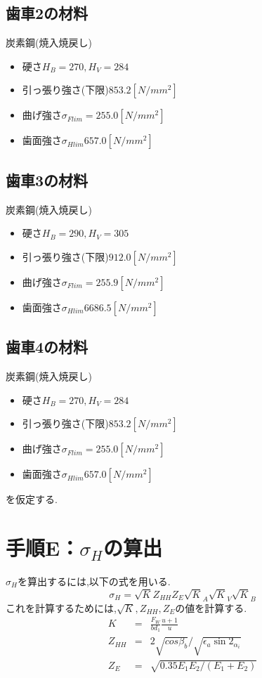 \documentclass[a4j,twoside,openright,11pt]{jreport}
\begin{document}
\subsection{歯車2の材料}
炭素鋼(焼入焼戻し)
\begin{itemize}
\item 硬さ$ H_B = 270,H_V=284$
\item 引っ張り強さ(下限)$853.2[N/mm^2]$
\item 曲げ強さ$\sigma_{Flim}=255.0[N/mm^2]$
\item 歯面強さ$\sigma_{Hlim}657.0[N/mm^2]$
\end{itemize}
\subsection{歯車3の材料}
炭素鋼(焼入焼戻し)
\begin{itemize}
\item 硬さ$ H_B = 290,H_V=305$
\item 引っ張り強さ(下限)$912.0[N/mm^2]$
\item 曲げ強さ$\sigma_{Flim}=255.9[N/mm^2]$
\item 歯面強さ$\sigma_{Hlim}6686.5[N/mm^2]$
\end{itemize}
\subsection{歯車4の材料}
炭素鋼(焼入焼戻し)
\begin{itemize}
\item 硬さ$ H_B = 270,H_V=284$
\item 引っ張り強さ(下限)$853.2[N/mm^2]$
\item 曲げ強さ$\sigma_{Flim}=255.0[N/mm^2]$
\item 歯面強さ$\sigma_{Hlim}657.0[N/mm^2]$
\end{itemize}
を仮定する.
\section{手順E：$\sigma_H$の算出}
$\sigma_H$を算出するには,以下の式を用いる.
\begin{equation}
\sigma_H=\sqrt K Z_{HH}Z_{E}\sqrt K_A \sqrt K_V \sqrt K_B\nonumber
\end{equation}
これを計算するためには,$\sqrt K, Z_{HH},Z_{E}$の値を計算する.
\begin{eqnarray}
K &=&\frac{F_W}{bd_1}\frac{u+1}{u}\nonumber\\
Z_{HH}&=&2\sqrt{cos{\beta_b}}/\sqrt{\epsilon_a \sin{2_{\alpha_i}}}\nonumber\\
Z_E&=&\sqrt{0.35E_1E_2/(E_1+E_2)}\nonumber
\end{eqnarray}
\end{document}
